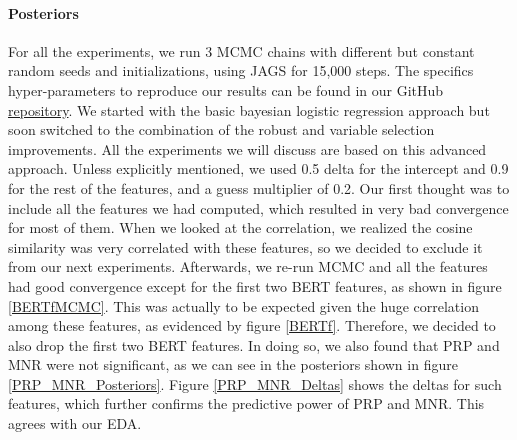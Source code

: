 \vspace{2mm}

\paragraph{Posteriors} For all the experiments, we run 3 MCMC chains with different but constant random seeds and initializations, using JAGS for 15,000 steps. The specifics hyper-parameters to reproduce our results can be found in our GitHub \href{https://github.com/seanpili/-fakesAreBAye/blob/master/RecurrentUsers/experiments.txt}{repository}. We started with the basic bayesian logistic regression approach but soon switched to the combination of the robust and variable selection improvements. All the experiments we will discuss are based on this advanced approach. Unless explicitly mentioned, we used 0.5 delta for the intercept and 0.9 for the rest of the features, and a guess multiplier of 0.2. Our first thought was to include all the features we had computed, which resulted in very bad convergence for most of them. When we looked at the correlation, we realized the cosine similarity was very correlated with these features, so we decided to exclude it from our next experiments. Afterwards, we re-run MCMC and all the features had good convergence except for the first two BERT features, as shown in figure \ref{BERTfMCMC}. This was actually to be expected given the huge correlation among these features, as evidenced by figure \ref{BERTf}. Therefore, we decided to also drop the first two BERT features. In doing so, we also found that PRP and MNR were not significant, as we can see in the posteriors shown in figure \ref{PRP_MNR_Posteriors}. Figure \ref{PRP_MNR_Deltas} shows the deltas for such features, which further confirms the predictive power of PRP and MNR. This agrees with our EDA.

